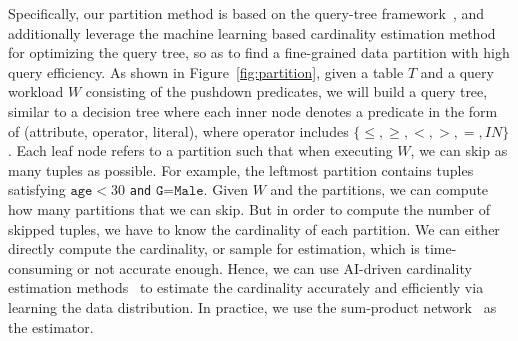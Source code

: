  Specifically, our partition method is based on the query-tree framework~\cite{qdtree}, and additionally leverage the machine learning based cardinality estimation method for optimizing the query tree, so as to find a fine-grained data partition with high query efficiency. 
As shown in Figure~\ref{fig:partition}, given a table $T$ and a query workload $W$ consisting of the pushdown predicates, we will build a query tree, similar to a decision tree where each inner node denotes a predicate in the form of (attribute, operator, literal), where operator includes $\{\leq, \geq, <, >, =, IN\}$. Each leaf node refers to a partition such that when executing $W$, we can skip as many tuples as possible. For example, the leftmost partition contains tuples satisfying $\texttt{age}<30$ \texttt{and} $\texttt{G=Male}$. Given $W$ and the partitions, we can compute how many partitions that we can skip. But in order to compute the number of skipped tuples, we have to know the cardinality of each partition. We can either directly compute the cardinality, or sample for estimation, which is time-consuming or not accurate enough. Hence, we can use AI-driven cardinality estimation methods~\cite{face, e2e, naru, deepdb} to estimate the cardinality accurately and efficiently via learning the data distribution. In practice, we use the sum-product network~\cite{deepdb} as the estimator. 




